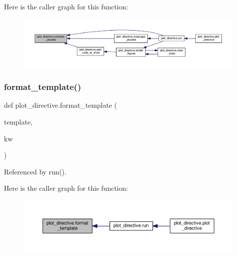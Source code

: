 Here is the caller graph for this function\+:
\nopagebreak
\begin{figure}[H]
\begin{center}
\leavevmode
\includegraphics[width=350pt]{namespaceplot__directive_ac5b52bd431613c97ce90c1f63d8ddec6_icgraph}
\end{center}
\end{figure}
\mbox{\label{namespaceplot__directive_a572890d21d60caee16537894928e5c31}} 
\subsubsection{\texorpdfstring{format\+\_\+template()}{format\_template()}}
{\footnotesize\ttfamily def plot\+\_\+directive.\+format\+\_\+template (\begin{DoxyParamCaption}\item[{}]{template,  }\item[{}]{kw }\end{DoxyParamCaption})}



Referenced by run().

Here is the caller graph for this function\+:
\nopagebreak
\begin{figure}[H]
\begin{center}
\leavevmode
\includegraphics[width=350pt]{namespaceplot__directive_a572890d21d60caee16537894928e5c31_icgraph}
\end{center}
\end{figure}
\mbox{\label{namespaceplot__directive_a7f30576eb7e350db2c39b385bf46b6bd}} 
